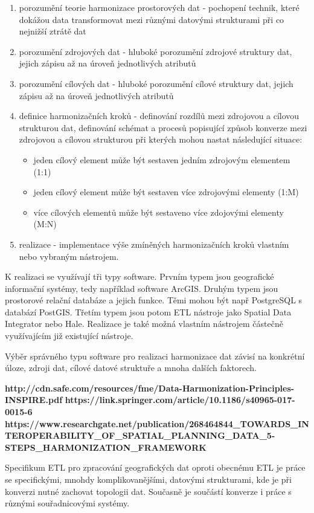 \begin{enumerate}
  \item porozumění teorie harmonizace prostorových dat - pochopení technik, které dokážou data transformovat mezi různými datovými strukturami při co nejnižší ztrátě dat
  \item porozumění zdrojových dat - hluboké porozumění zdrojové struktury dat, jejich zápisu až na úroveň jednotlivých atributů
  \item porozumění cílových dat - hluboké porozumění cílové struktury dat, jejich zápisu až na úroveň jednotlivých atributů
  \item definice harmonizačních kroků - definování rozdílů mezi zdrojovou a cílovou strukturou dat, definování schémat a procesů popisující způsob konverze mezi zdrojovou a cílovou strukturou při kterých mohou nastat následující situace: 
  \begin{itemize}
    \item jeden cílový element může být sestaven jedním zdrojovým elementem (1:1)
    \item jeden cílový element může být sestaven více zdrojovými elementy (1:M)
    \item více cílových elementů může být sestaveno více zdojovými elementy (M:N)
  \end{itemize}
  \item realizace - implementace výše zmíněných harmonizačních kroků vlastním nebo vybraným nástrojem. 
\end{enumerate}

K realizaci se využívají tři typy software. Prvním typem jsou geografické informační systémy, tedy například software ArcGIS. Druhým typem jsou prostorové relační databáze a jejich funkce. Těmi mohou být např PostgreSQL s databází PostGIS. Třetím typem jsou potom ETL nástroje jako Spatial Data Integrator nebo Hale. Realizace je také možná vlastním nástrojem částečně využívajícím již existující nástroje.

Výběr správného typu software pro realizaci harmonizace dat závisí na konkrétní úloze, zdroji dat, cílové datové struktuře a mnoha dalších faktorech. 

\textbf{http://cdn.safe.com/resources/fme/Data-Harmonization-Principles-INSPIRE.pdf}
\textbf{https://link.springer.com/article/10.1186/s40965-017-0015-6}
\textbf{https://www.researchgate.net/publication/268464844\_TOWARDS\_INTEROPERABILITY\_OF\_SPATIAL\_PLANNING\_DATA\_5-STEPS\_HARMONIZATION\_FRAMEWORK}

Specifikum ETL pro zpracování geografických dat oproti obecnému ETL je práce se specifickými, mnohdy komplikovanějšími, datovými strukturami, kde je při konverzi nutné zachovat topologii dat. Současně je součástí konverze i práce s různými souřadnicovými systémy.


